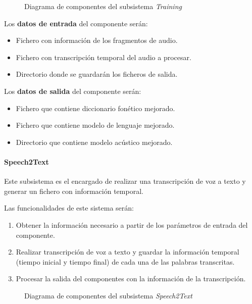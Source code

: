 \documentclass[../main.tex]{subfiles}
\begin{document}
\begin{figure}[H]
    \centering
    
    \label{fig:components_training}
    \caption{Diagrama de componentes del subsistema \textit{Training}}
\end{figure}

Los \textbf{datos de entrada} del componente serán:
\begin{itemize}
    \item Fichero con información de los fragmentos de audio.
    \item Fichero con transcripción temporal del audio a procesar.
    \item Directorio donde se guardarán los ficheros de salida.
\end{itemize}

Los \textbf{datos de salida} del componente serán:
\begin{itemize}
    \item Fichero que contiene diccionario fonético mejorado.
    \item Fichero que contiene modelo de lenguaje mejorado.
    \item Directorio que contiene modelo acústico mejorado.
\end{itemize}

\paragraph{Speech2Text}\label{par:speech2text}
Este subsistema es el encargado de realizar una transcripción de voz a texto y generar un fichero con información temporal.


Las funcionalidades de este sistema serán:
\begin{enumerate}
    \item Obtener la información necesario a partir de los parámetros de entrada del componente.
    \item Realizar transcripción de voz a texto y guardar la información temporal (tiempo inicial y tiempo final) de cada una de las palabras transcritas.
    \item Procesar la salida del componentes con la información de la transcripción.%
\end{enumerate}

\begin{figure}[H]
    \centering
    
    \label{fig:components_speech2text}
    \caption{Diagrama de componentes del subsistema \textit{Speech2Text}}
\end{figure}
\end{document}
